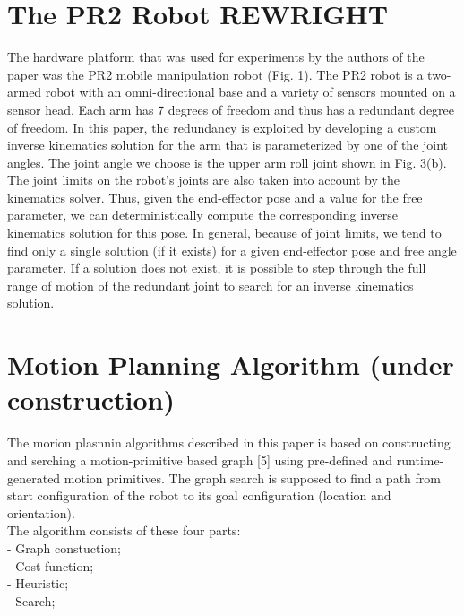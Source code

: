 \documentclass[11pt]{article}
\begin{document}
\section{The PR2 Robot REWRIGHT}
The hardware platform that was used for experiments by the authors of the paper was the PR2 mobile manipulation robot (Fig. 1). The PR2 robot is a two-armed robot with an omni-directional base and a variety of sensors mounted on a sensor head. Each arm has 7 degrees of freedom and thus has a redundant degree of freedom. In this paper, the redundancy is exploited by developing a custom inverse kinematics solution for the arm that is parameterized by one of the joint angles. The joint angle we choose is the upper arm roll joint shown in Fig. 3(b). The joint limits on the robot’s joints are also taken into account by the kinematics solver. Thus, given the end-effector pose and a value for the free parameter, we can deterministically compute the corresponding inverse kinematics solution for this pose. In general, because of joint limits, we tend to find only a single solution (if it exists) for a given end-effector pose and free angle parameter. If a solution does not exist, it is possible to step through the full range of motion of the redundant joint to search for an inverse kinematics solution.

\section{Motion Planning Algorithm (under construction)}
The morion plasnnin algorithms described in this paper is based on constructing and serching a motion-primitive based graph [5] using pre-defined and runtime-generated motion primitives. The graph search is supposed to find a path from start configuration of the robot to its goal configuration (location and orientation).\\
The algorithm consists of these four parts:\\
 - Graph constuction;\\
 - Cost function;\\
 - Heuristic;\\
 - Search;
\end{document}

